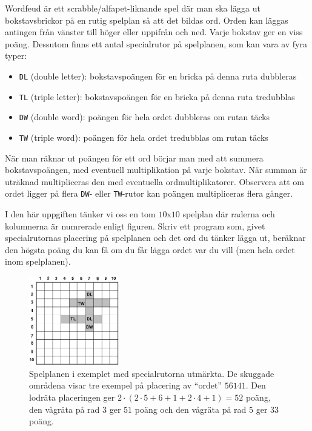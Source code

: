 Wordfeud är ett scrabble/alfapet-liknande spel där man ska lägga ut bokstavsbrickor på en rutig spelplan så att det bildas ord. Orden kan läggas antingen från vänster till höger eller uppifrån och ned. Varje bokstav ger en viss poäng. Dessutom finns ett antal specialrutor på spelplanen, som kan vara av fyra typer:

\begin{itemize}
	\item \texttt{DL} (double letter): bokstavspoängen för en bricka på denna ruta dubbleras
	\item \texttt{TL} (triple letter): bokstavspoängen för en bricka på denna ruta tredubblas
	\item \texttt{DW} (double word): poängen för hela ordet dubbleras om rutan täcks
	\item \texttt{TW} (triple word): poängen för hela ordet tredubblas om rutan täcks
\end{itemize}

När man räknar ut poängen för ett ord börjar man med att summera bokstavspoängen, med eventuell multiplikation på varje bokstav. När summan är uträknad multipliceras den med eventuella ordmultiplikatorer. Observera att om ordet ligger på flera \texttt{DW}- eller \texttt{TW}-rutor kan poängen multipliceras flera gånger.

I den här uppgiften tänker vi oss en tom $10$x$10$ spelplan där raderna och kolumnerna är numrerade enligt figuren. Skriv ett program som, givet specialrutornas placering på spelplanen och det ord du tänker lägga ut, beräknar den högsta poäng du kan få om du får lägga ordet var du vill (men hela ordet inom spelplanen).

\begin{figure}[!h]
	\centering
	\includegraphics[width=0.35\textwidth]{wordfeud}
	\caption{Spelplanen i exemplet med specialrutorna utmärkta. De skuggade områdena visar tre exempel på placering av “ordet” $56141$. Den lodräta placeringen ger $2\cdot(2\cdot5+6+1+2\cdot4+1)=52$ poäng, den vågräta på rad $3$ ger $51$ poäng och den vågräta på rad $5$ ger $33$ poäng.}
\end{figure}

